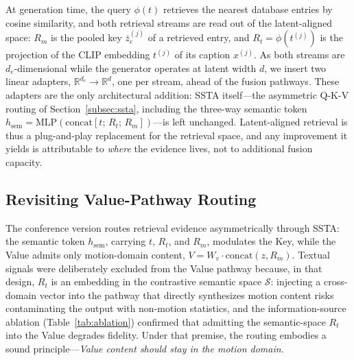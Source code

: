\noindent {}
At generation time, the query $\phi(t)$ retrieves the nearest database entries by cosine similarity, and both retrieval streams are read out of the latent-aligned space: $R_m$ is the pooled key $\bar{z}_e^{(j)}$ of a retrieved entry, and $R_t = \phi(t^{(j)})$ is the projection of the CLIP embedding $t^{(j)}$ of its caption $x^{(j)}$. As both streams are $d_e$-dimensional while the generator operates at latent width $d$, we insert two linear adapters, $\mathbb{R}^{d_e} \rightarrow \mathbb{R}^{d}$, one per stream, ahead of the fusion pathways. These adapters are the only architectural addition: SSTA itself---the asymmetric Q-K-V routing of Section~\ref{subsec:ssta}, including the three-way semantic token $h_{\mathrm{sem}} = \mathrm{MLP}(\mathrm{concat}[t;\, R_t;\, R_m])$---is left unchanged. Latent-aligned retrieval is thus a plug-and-play replacement for the retrieval space, and any improvement it yields is attributable to \emph{where} the evidence lives, not to additional fusion capacity.

\subsection{Revisiting Value-Pathway Routing}
\label{subsec:vroute}

The conference version routes retrieval evidence asymmetrically through SSTA: the semantic token $h_{\mathrm{sem}}$, carrying $t$, $R_t$, and $R_m$, modulates the Key, while the Value admits only motion-domain content, $V = W_v \cdot \mathrm{concat}(z, R_m)$. Textual signals were deliberately excluded from the Value pathway because, in that design, $R_t$ is an embedding in the contrastive semantic space $\mathcal{S}$: injecting a cross-domain vector into the pathway that directly synthesizes motion content risks contaminating the output with non-motion statistics, and the information-source ablation (Table~\ref{tab:ablation}) confirmed that admitting the semantic-space $R_t$ into the Value degrades fidelity. Under that premise, the routing embodies a sound principle---\emph{Value content should stay in the motion domain}.

